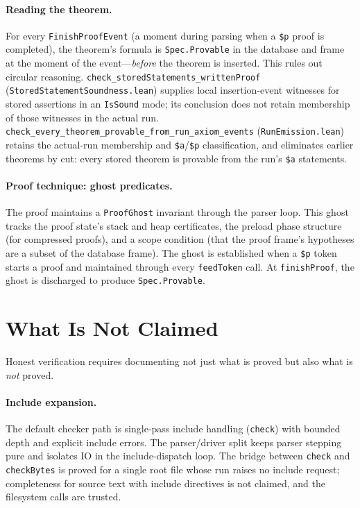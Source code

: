 \documentclass[11pt]{article}
\newcommand{\lean}[1]{\lstinline[language=Lean4]{#1}}
\newcommand{\file}[1]{\texttt{#1}}
\begin{document}
\paragraph{Reading the theorem.}
For every \lean{FinishProofEvent} (a moment during parsing when
a \texttt{\$p} proof is completed), the theorem's formula is
\lean{Spec.Provable} in the database and frame at the moment of
the event---\emph{before} the theorem is inserted.  This rules out
circular reasoning.
\lean{check_storedStatements_writtenProof}
(\file{StoredStatementSoundness.lean}) supplies local insertion-event
witnesses for stored assertions in an \lean{IsSound} mode; its conclusion
does not retain membership of those witnesses in the actual run.
\lean{check_every_theorem_provable_from_run_axiom_events}
(\file{RunEmission.lean}) retains the actual-run membership and
\verb|$a|/\verb|$p| classification, and eliminates earlier theorems by cut:
every stored theorem is provable from the run's \verb|$a| statements.

\paragraph{Proof technique: ghost predicates.}
The proof maintains a \lean{ProofGhost} invariant through the parser
loop.  This ghost tracks the proof state's stack and heap certificates,
the preload phase structure (for compressed proofs), and a scope
condition (that the proof frame's hypotheses are a subset of the
database frame).  The ghost is established when a \texttt{\$p} token
starts a proof and maintained through every \lean{feedToken} call.
At \lean{finishProof}, the ghost is discharged to produce
\lean{Spec.Provable}.

\section{What Is Not Claimed}
\label{sec:notclaimed}

Honest verification requires documenting not just what is proved but
also what is \emph{not} proved.

\paragraph{Include expansion.}
The default checker path is single-pass include handling
(\lean{check}) with bounded depth and explicit include errors.
The parser/driver split keeps parser stepping pure and isolates IO in
the include-dispatch loop.  The bridge between \lean{check} and
\lean{checkBytes} is proved for a single root file whose run raises no
include request; completeness for source text with include directives is
not claimed, and the filesystem calls are trusted.
\end{document}

